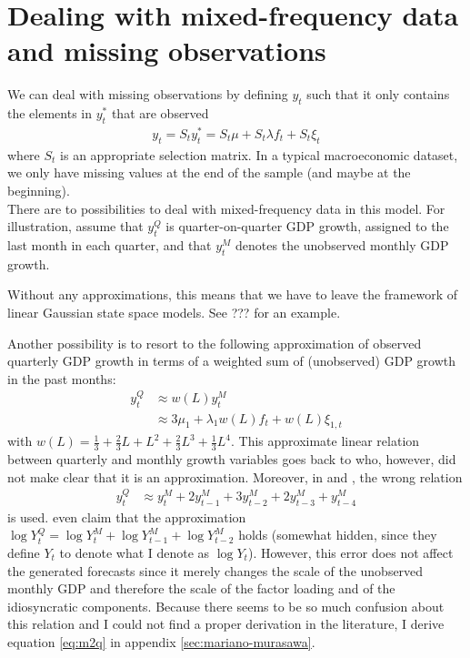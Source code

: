 
\section{Dealing with mixed-frequency data and missing observations}\label{sec:mixed-frequency}

We can deal with missing observations by defining $y_t$ such that it only contains the elements in $y_t^*$ that are observed
\begin{align}
y_t = S_t y^*_t = S_t\mu + S_t \lambda f_t + S_t \xi_t
\end{align}
where $S_t$ is an appropriate selection matrix. In a typical macroeconomic dataset, we only have missing values at the end of the sample (and maybe at the beginning). \\


There are to possibilities to deal with mixed-frequency data in this model. For illustration, assume that $y_t^Q$ is quarter-on-quarter GDP growth, assigned to the last month in each quarter, and that $y_t^M$ denotes the unobserved monthly GDP growth.  

\citet{ProiettiMoauro2006}
Without any approximations, this means that we have to leave the framework of linear Gaussian state space models. See ??? for an example.

Another possibility is to resort to the following approximation of observed quarterly GDP growth in terms of a weighted sum of (unobserved) GDP growth in the past months:
\begin{align}
y^Q_{t} &\approx w(L) y^M_{t} \\ \label{eq:m2q}
&\approx 3\mu_1 + \lambda_1 w(L) f_t + w(L) \xi_{1,t}
\end{align}
with $w(L) = \frac{1}{3} + \frac{2}{3} L + L^2 + \frac{2}{3} L^3 + \frac{1}{3} L^4$. This approximate linear relation between quarterly and monthly growth variables goes back to \citet{MarianoMurasawa2003} who, however, did not make clear that it is an approximation. Moreover, in \citet{LucianiRicci2014} and \citet{BanburaEtal2013}, the wrong relation
\begin{align*}
y^Q_{t} &\approx y^M_{t} + 2y^M_{t-1} + 3y^M_{t-2} + 2y^M_{t-3} + y^M_{t-4}
\end{align*}
is used. \citet[p. 239]{LucianiRicci2014} even claim that the approximation $\log Y_t^Q = \log Y_t^M + \log Y_{t-1}^M + \log Y_{t-2}^M$ holds (somewhat hidden, since they define $Y_t$ to denote what I denote as $\log Y_t$). However, this error does not affect the generated forecasts since it merely changes the scale of the unobserved monthly GDP and therefore the scale of the factor loading and of the idiosyncratic components. Because there seems to be so much confusion about this relation and I could not find a proper derivation in the literature, I derive equation \ref{eq:m2q} in appendix \ref{sec:mariano-murasawa}.\\

